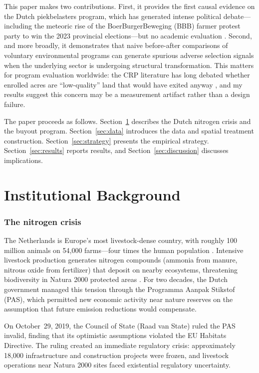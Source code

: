 \documentclass[12pt]{article}
\begin{document}
This paper makes two contributions. First, it provides the first causal evidence on the Dutch piekbelasters program, which has generated intense political debate---including the meteoric rise of the BoerBurgerBeweging (BBB) farmer protest party to win the 2023 provincial elections---but no academic evaluation \citep{debach2022farmer}. Second, and more broadly, it demonstrates that naive before-after comparisons of voluntary environmental programs can generate spurious adverse selection signals when the underlying sector is undergoing structural transformation. This matters for program evaluation worldwide: the CRP literature has long debated whether enrolled acres are ``low-quality'' land that would have exited anyway \citep{wu2001slippage, feng2004clean, anderson2015fundamentals}, and my results suggest this concern may be a measurement artifact rather than a design failure.

The paper proceeds as follows. Section~\ref{sec:background} describes the Dutch nitrogen crisis and the buyout program. Section~\ref{sec:data} introduces the data and spatial treatment construction. Section~\ref{sec:strategy} presents the empirical strategy. Section~\ref{sec:results} reports results, and Section~\ref{sec:discussion} discusses implications.

\section{Institutional Background}
\label{sec:background}

\subsubsection*{The nitrogen crisis} The Netherlands is Europe's most livestock-dense country, with roughly 100 million animals on 54,000 farms---four times the human population \citep{stokstad2023nitrogen}. Intensive livestock production generates nitrogen compounds (ammonia from manure, nitrous oxide from fertilizer) that deposit on nearby ecosystems, threatening biodiversity in Natura 2000 protected areas \citep{sterner2003nitrogen}. For two decades, the Dutch government managed this tension through the Programma Aanpak Stikstof (PAS), which permitted new economic activity near nature reserves on the assumption that future emission reductions would compensate.

On October~29, 2019, the Council of State (Raad van State) ruled the PAS invalid, finding that its optimistic assumptions violated the EU Habitats Directive. The ruling created an immediate regulatory crisis: approximately 18,000 infrastructure and construction projects were frozen, and livestock operations near Natura 2000 sites faced existential regulatory uncertainty.
\end{document}
